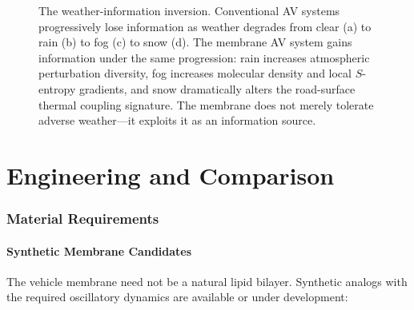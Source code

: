 \documentclass[twocolumn,10pt]{article}
\theoremstyle{definition}
\theoremstyle{remark}
\begin{document}
\begin{figure}[H]
\centering
{}
\caption{The weather-information inversion. Conventional AV systems progressively lose information as weather degrades from clear (a) to rain (b) to fog (c) to snow (d). The membrane AV system gains information under the same progression: rain increases atmospheric perturbation diversity, fog increases molecular density and local $S$-entropy gradients, and snow dramatically alters the road-surface thermal coupling signature. The membrane does not merely tolerate adverse weather---it exploits it as an information source.}
\label{fig:weather_inversion}
\end{figure}


\part{Engineering and Comparison}
\label{part:engineering}

\section{Material Requirements}
\label{sec:materials}

\subsection{Synthetic Membrane Candidates}

The vehicle membrane need not be a natural lipid bilayer. Synthetic analogs with the required oscillatory dynamics are available or under development:
\end{document}
